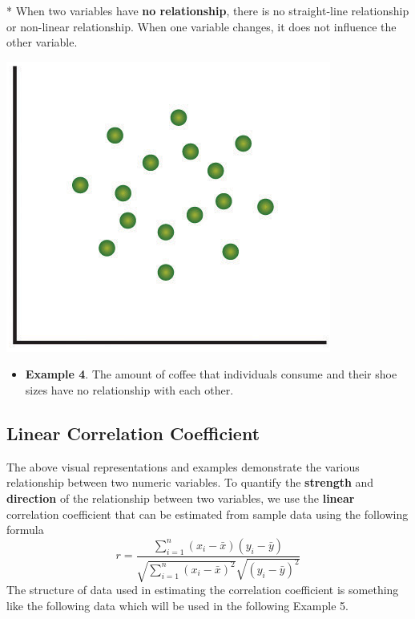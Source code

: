 \documentclass[
]{book}
\providecommand{\tightlist}{%
  \setlength{\itemsep}{0pt}\setlength{\parskip}{0pt}}
\begin{document}
\hfill\break
* When two variables have \textbf{no relationship}, there is no straight-line relationship or non-linear relationship. When one variable changes, it does not influence the other variable.

\hfill\break

\begin{center}\includegraphics[width=0.5\linewidth]{week12/uncorrelated} \end{center}

\begin{itemize}
\tightlist
\item
  \textbf{Example 4}. The amount of coffee that individuals consume and their shoe sizes have no relationship with each other.\\
\end{itemize}

\hfill\break

\hypertarget{linear-correlation-coefficient}{%
\subsection{Linear Correlation Coefficient}\label{linear-correlation-coefficient}}

\hfill\break
The above visual representations and examples demonstrate the various relationship between two numeric variables. To quantify the \textbf{strength} and \textbf{direction} of the relationship between two variables, we use the \textbf{linear} correlation coefficient that can be estimated from sample data using the following formula
\[
r = \frac{\sum_{i=1}^n(x_i-\bar{x})(y_i-\bar{y})}{\sqrt{\sum_{i=1}^n(x_i-\bar{x})^2}\sqrt{(y_i-\bar{y})^2}}
\]
The structure of data used in estimating the correlation coefficient is something like the following data which will be used in the following Example 5.
\end{document}
